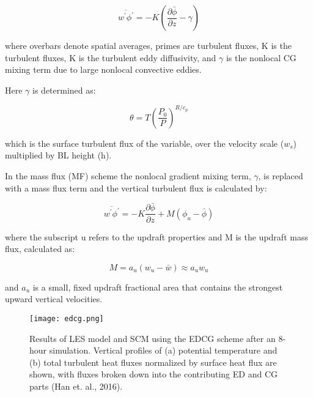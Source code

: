 \documentclass[12pt]{article}
\begin{document}
\bigskip

\begin{equation}
    \overline{w^{\prime} \phi^{\prime}}=-K\left(\frac{\partial \bar{\phi}}{\partial z}-\gamma\right)
\end{equation}

\bigskip

where overbars denote spatial averages, primes are turbulent fluxes, K is the turbulent fluxes, 
K is the turbulent eddy diffusivity, and $\gamma$ is the nonlocal CG mixing
term due to large nonlocal convective eddies.

\bigskip

Here $\gamma$ is determined as:

\bigskip

\begin{equation}
    \theta=T\left(\frac{P_{0}}{P}\right)^{R / c_{p}}
\end{equation}

\bigskip

which is the surface turbulent flux of the variable, over the velocity scale ($w_s$) multiplied 
by BL height (h).

\bigskip

In the mass flux (MF) scheme the nonlocal gradient mixing term, $\gamma$, is replaced with a mass 
flux term and the vertical turbulent flux is calculated by:

\bigskip

\begin{equation}
    \overline{w^{\prime} \phi^{\prime}}=-K \frac{\partial \bar{\phi}}{\partial z}+M\left(\phi_{u}-\bar{\phi}\right)
\end{equation}

\bigskip

where the subscript u refers to the updraft properties and M is the updraft mass flux, calculated as:

\bigskip

\begin{equation}
    M=a_{u}\left(w_{u}-\bar{w}\right) \approx a_{u} w_{u}
\end{equation}

\bigskip

and $a_u$ is a small, fixed updraft fractional area that contains the strongest upward vertical velocities.

\bigskip

\begin{figure}[h]
    \centering
    \texttt{[image: edcg.png]}
    \caption{Results of LES model and SCM using the EDCG scheme after an 8-hour 
    simulation. Vertical profiles of (a) potential temperature and (b) total 
    turbulent heat fluxes normalized by surface heat flux are shown, with fluxes 
    broken down into the contributing ED and CG parts (Han et. al., 2016).}
    \label{fig:edcg}
\end{figure}
\end{document}
